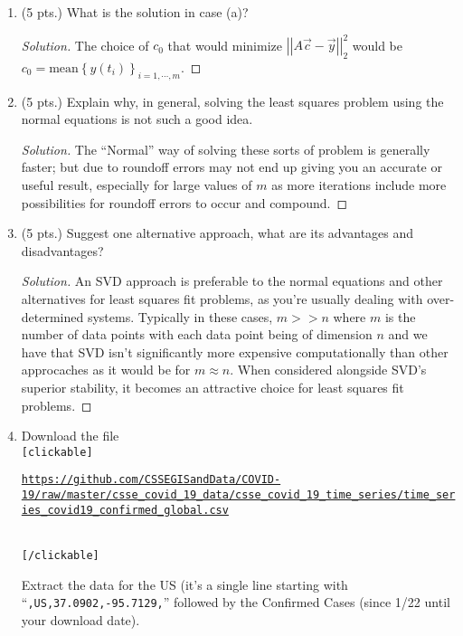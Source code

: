 \documentclass[12pt]{article}
\newcommand{\gnorm}[1]{\left|\left|#1\right|\right|}
\newcommand{\bracks}[1]{\left\{#1\right\}}
\begin{document}
\begin{enumerate}
\begin{enumerate}
     
   \item (5 pts.) What is the solution in case (a)?
   \begin{proof}[Solution]
   The choice of $c_0$ that would minimize $\gnorm{A\vec{c} - \vec{y}}_2^2$ would be $c_0 = \text{mean}\bracks{y(t_i)}_{i = 1, \cdots, m}$.
   \end{proof}
	 
     
     
   \item (5 pts.) Explain why, in general, solving the least squares
     problem using the normal equations is not such a good idea.
     \begin{proof}[Solution]
     The ``Normal'' way of solving these sorts of problem is generally faster; but due to roundoff errors may not end up giving you an accurate or useful result, especially for large values of $m$ as more iterations include more possibilities for roundoff errors to occur and compound.
     \end{proof}

     
   \item (5 pts.) Suggest one alternative approach, what are its advantages
     and disadvantages?
     \begin{proof}[Solution]
     An SVD approach is preferable to the normal equations and other alternatives for least squares fit problems, as you're usually dealing with over-determined systems. Typically in these cases, $m >> n$ where $m$ is the number of data points with each data point being of dimension $n$ and we have that SVD isn't significantly more expensive computationally than other approcaches as it would be for $m \approx n$. When considered alongside SVD's superior stability, it becomes an attractive choice for least squares fit problems. 
     \end{proof}


   \item Download the file\\
     \texttt{[clickable]}\\
     \hspace*{1em}\parbox[t]{\linegoal}{\texttt{\scriptsize\url{https://github.com/CSSEGISandData/COVID-19/raw/master/csse_covid_19_data/csse_covid_19_time_series/time_series_covid19_confirmed_global.csv}}}\\
     \texttt{[/clickable]}

     Extract the data for the US (it's a single line starting with
     ``\texttt{,US,37.0902,-95.7129,}'' followed by the Confirmed Cases (since
     1/22 until your download date).\\


\end{enumerate}
\end{enumerate}
\end{document}

